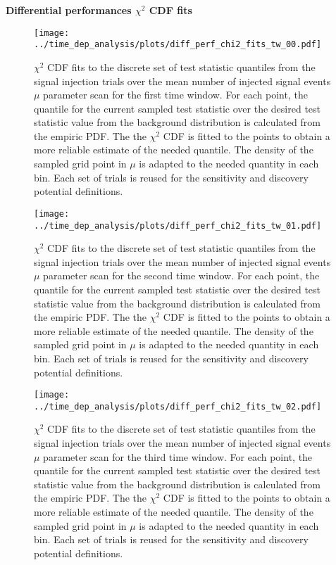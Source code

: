 \textbf{\Large\sffamily Differential performances $\chi^2$ CDF fits}
\enlargethispage*{5cm}
\begin{figure}[H]
  \centering
  \texttt{[image: ../time\_dep\_analysis/plots/diff\_perf\_chi2\_fits\_tw\_00.pdf]}
  \caption[$\chi^2$ CDF fits for the 1st time window differential performance]{
     $\chi^2$ CDF fits to the discrete set of test statistic quantiles from the signal injection trials over the mean number of injected signal events $\mu$ parameter scan for the first time window.
     For each point, the quantile for the current sampled test statistic over the desired test statistic value from the background distribution is calculated from the empiric PDF.
     The the $\chi^2$ CDF is fitted to the points to obtain a more reliable estimate of the needed quantile.
     The density of the sampled grid point in $\mu$ is adapted to the needed quantity in each bin.
     Each set of trials is reused for the sensitivity and discovery potential definitions.
  }
  \label{fig:diff_perf_chi2_fits_tw_00}
\end{figure}
\begin{figure}[H]
  \centering
  \texttt{[image: ../time\_dep\_analysis/plots/diff\_perf\_chi2\_fits\_tw\_01.pdf]}
  \caption[$\chi^2$ CDF fits for the 2nd time window differential performance]{
     $\chi^2$ CDF fits to the discrete set of test statistic quantiles from the signal injection trials over the mean number of injected signal events $\mu$ parameter scan for the second time window.
     For each point, the quantile for the current sampled test statistic over the desired test statistic value from the background distribution is calculated from the empiric PDF.
     The the $\chi^2$ CDF is fitted to the points to obtain a more reliable estimate of the needed quantile.
     The density of the sampled grid point in $\mu$ is adapted to the needed quantity in each bin.
     Each set of trials is reused for the sensitivity and discovery potential definitions.
  }
  \label{fig:diff_perf_chi2_fits_tw_01}
\end{figure}
\begin{figure}[H]
  \centering
  \texttt{[image: ../time\_dep\_analysis/plots/diff\_perf\_chi2\_fits\_tw\_02.pdf]}
  \caption[$\chi^2$ CDF fits for the 3rd time window differential performance]{
     $\chi^2$ CDF fits to the discrete set of test statistic quantiles from the signal injection trials over the mean number of injected signal events $\mu$ parameter scan for the third time window.
     For each point, the quantile for the current sampled test statistic over the desired test statistic value from the background distribution is calculated from the empiric PDF.
     The the $\chi^2$ CDF is fitted to the points to obtain a more reliable estimate of the needed quantile.
     The density of the sampled grid point in $\mu$ is adapted to the needed quantity in each bin.
     Each set of trials is reused for the sensitivity and discovery potential definitions.
  }
  \label{fig:diff_perf_chi2_fits_tw_02}
\end{figure}
